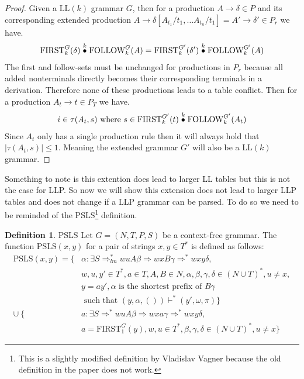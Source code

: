 \documentclass[a4paper,12pt]{article}
\newcommand{\truncprod}[1]{\stackrel{\mathclap{#1}}{\bullet}}
\newcommand\LL{\text{LL}}
\newcommand\PSLS{\text{PSLS}}
\newcommand\FIRST{\text{FIRST}}
\newcommand\FOLLOW{\text{FOLLOW}}
\theoremstyle{definition}
\newtheorem{definition}{Definition}[section]
\begin{document}
\begin{proof}
  Given a $\LL(k)$ grammar $G$, then for a production $A \to \delta \in P$ and its corresponding extended production $A \to \delta[A_{t_1}/t_1, \dots A_{t_n}/t_1] = A' \to \delta' \in P_r$ we have.
  \begin{align*}
    \FIRST^G_k(\delta) \truncprod{k} \FOLLOW^G_k(A) = \FIRST^{G'}_k(\delta') \truncprod{k} \FOLLOW^{G'}_k(A)
  \end{align*}
  The first and follow-sets must be unchanged for productions in $P_r$ because all added nonterminals directly becomes their corresponding terminals in a derivation. Therefore none of these productions leads to a table conflict. Then for a production $A_t \to t \in P_T$ we have.
  \begin{gather*}
    i \in \tau(A_t, s) \text{ where } s \in \FIRST^{G'}_k(t) \truncprod{k} \FOLLOW^{G'}_k(A_t)
  \end{gather*}
  Since $A_t$ only has a single production rule then it will always hold that $|\tau(A_t, s)| \leq 1$. Meaning the extended grammar $G'$ will also be a $\LL(k)$ grammar.
\end{proof}
Something to note is this extention does lead to larger LL tables but this is not the case for LLP. So now we will show this extension does not lead to larger LLP tables and does not change if a LLP grammar can be parsed. To do so we need to be reminded of the PSLS\footnote{This is a slightly modified definition by Vladislav Vagner because the old definition in the paper does not work.} \cite{Vagner2007} definition.
\begin{definition}{PSLS}
  Let $G = (N, T, P, S)$ be a context-free grammar. The function $\PSLS(x, y)$ for a pair of strings $x, y \in T^*$ is defined as follows:
  \begin{align*}
    \text{PSLS}(x, y) = \{ & \alpha : \exists S \Rightarrow^*_{lm} wuA\beta \Rightarrow wxB\gamma \Rightarrow^* wxy\delta, \\
    & w, u, y' \in T^*, a \in T, A, B \in N, \alpha, \beta, \gamma, \delta \in (N \cup T)^*, u \neq x, \\
    & y = ay', \alpha \text{ is the shortest prefix of } B\gamma \\ 
    & \text{ such that } (y, \alpha, ()) \vdash^* (y', \omega, \pi)\} \\
    \cup \: \{ & a : \exists S \Rightarrow^* wuA\beta \Rightarrow wxa\gamma \Rightarrow^* wxy\delta, \\
    & a = \text{FIRST}^G_1(y), w,u \in T^*, \beta, \gamma, \delta \in (N \cup T)^*, u \neq x \}
  \end{align*}
\end{definition}
\end{document}
